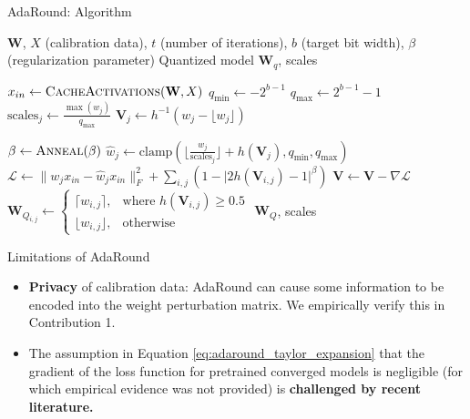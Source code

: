 \documentclass{beamer}
\begin{document}
\begin{frame}{AdaRound: Algorithm}
\begin{algorithm}[H]
\scriptsize
\caption{AdaRound}\label{alg:adaround}
\begin{algorithmic}[1]
\Require $\mathbf{W}$, $X$ (calibration data), $t$ (number of iterations), $b$ (target bit width), $\beta$ (regularization parameter)
\Ensure Quantized model $\mathbf{W}_q$, scales

\State $x_{in} \gets \textsc{CacheActivations}(\mathbf{W}, X)$ 
\State $q_{\text{min}} \gets -2^{b - 1}$
\State $q_{\text{max}} \gets 2^{b - 1} - 1$
\State $\text{scales}_j \gets \frac{\max(w_j)}{q_{\text{max}}}$ 
\State $\mathbf{V}_j \gets h^{-1}(w_j - \lfloor w_j \rfloor)$ 

\State $\beta \gets \textsc{Anneal}(\beta)$
\State $\hat{w}_j \gets \text{clamp}\left(\lfloor \frac{w_j}{\text{scales}_j} \rfloor + h(\mathbf{V}_j), q_\text{min}, q_\text{max}\right)$
\State $\mathcal{L} \gets \|w_j x_{in} - \hat{w}_j x_{in}\|_F^2 + \sum_{i, j} \left(1 - \lvert 2h(\mathbf{V}_{i,j}) - 1\rvert^\beta\right)$
\State $\mathbf{V} \gets \mathbf{V} - \nabla \mathcal{L}$ 
\EndFor
\State $\mathbf{W}_{Q_{i, j}} \gets \begin{cases}
    \lceil w_{i, j} \rceil, &\text{where } h(\mathbf{V}_{i,j}) \geq 0.5 \\
    \lfloor w_{i, j} \rfloor, &\text{otherwise}
\end{cases}$ 
\EndFor
\State \Return $\mathbf{W}_Q$, scales
\end{algorithmic}
\end{algorithm}
\end{frame}
\begin{frame}{Limitations of AdaRound}
\begin{itemize}
  \item \textbf{Privacy} of calibration data: AdaRound can cause some information to be encoded into the weight perturbation matrix. We empirically verify this in Contribution 1.
  \item The assumption in Equation \ref{eq:adaround_taylor_expansion} that the gradient of the loss function for pretrained converged models is negligible (for which empirical evidence was not provided) is \textbf{challenged by recent literature.} 
\end{itemize}
\end{frame}
\end{document}
